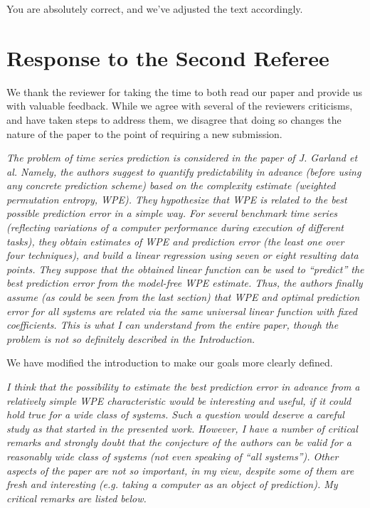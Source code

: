 \documentclass[12pt]{article}
\begin{document}
You are absolutely correct, and we've adjusted the text accordingly.

\section*{Response to the Second Referee}

We thank the reviewer for taking the time to both read our paper and provide us
with valuable feedback. While we agree with several of the reviewers criticisms,
and have taken steps to address them, we disagree that doing so changes the
nature of the paper to the point of requiring a new submission.

\emph{The problem of time series prediction is considered in the paper of J.
Garland et al. Namely, the authors suggest to quantify predictability in advance
(before using any concrete prediction scheme) based on the complexity estimate
(weighted permutation entropy, WPE). They hypothesize that WPE is related to the
best possible prediction error in a simple way. For several benchmark time
series (reflecting variations of a computer performance during execution of
different tasks), they obtain estimates of WPE and prediction error (the least
one over four techniques), and build a linear regression using seven or eight
resulting data points. They suppose that the obtained linear function can be
used to ``predict'' the best prediction error from the model-free WPE estimate.
Thus, the authors finally assume (as could be seen from the last section) that
WPE and optimal prediction error for all systems are related via the same
universal linear function with fixed coefficients. This is what I can understand
from the entire paper, though the problem is not so definitely described in the
Introduction.}

We have modified the introduction to make our goals more clearly defined.

\emph{I think that the possibility to estimate the best prediction error in
advance from a relatively simple WPE characteristic would be interesting and
useful, if it could hold true for a wide class of systems. Such a question would
deserve a careful study as that started in the presented work. However, I have a
number of critical remarks and strongly doubt that the conjecture of the authors
can be valid for a reasonably wide class of systems (not even speaking of ``all
systems''). Other aspects of the paper are not so important, in my view, despite
some of them are fresh and interesting (e.g. taking a computer as an object of
prediction). My critical remarks are listed below.}
\end{document}
